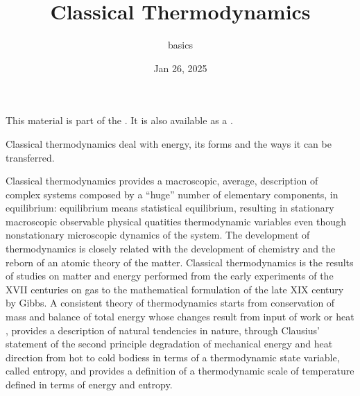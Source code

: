 \documentclass[letterpaper,10pt,english]{jupyterBook}
\title{Classical Thermodynamics}
\date{Jan 26, 2025}
\author{basics}
\begin{document}
\pagestyle{empty}
\sphinxmaketitle
\pagestyle{plain}
\sphinxtableofcontents
\pagestyle{normal}
\label{\detokenize{intro::doc}}


\sphinxAtStartPar
This material is part of the . It is also available as a .

\sphinxAtStartPar
Classical thermodynamics deal with energy, its forms and the ways it can be transferred.

\sphinxAtStartPar
Classical thermodynamics provides a macroscopic, average, description of complex systems composed by a “huge” number of elementary components, in equilibrium: equilibrium means statistical equilibrium, resulting in stationary macroscopic observable physical quatities \sphinxhyphen{} thermodynamic variables \sphinxhyphen{} even though non\sphinxhyphen{}stationary microscopic dynamics of the system. The development of thermodynamics is closely related with the development of chemistry and the re\sphinxhyphen{}born of an atomic theory of the matter. Classical thermodynamics is the results of studies on matter and energy performed from the early experiments of the XVII centuries on gas to the mathematical formulation of the late XIX century by Gibbs. A consistent theory of thermodynamics starts from conservation of mass and balance of total energy \sphinxhyphen{} whose changes result from input of work or heat \sphinxhyphen{}, provides a description of natural tendencies in nature, through Clausius’ statement of the second principle \sphinxhyphen{} degradation of mechanical energy and heat direction from hot to cold bodiess \sphinxhyphen{} in terms of a thermodynamic state variable, called entropy, and provides a definition of a thermodynamic scale of temperature \sphinxhyphen{} defined in terms of energy and entropy.



\sphinxstepscope
\end{document}
